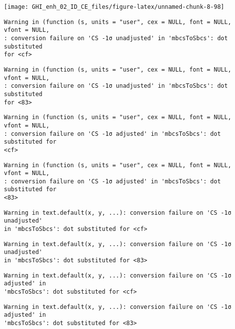 \documentclass[
  10pt,
  a4paper,oneside]{article}
\begin{document}
\begin{center}\texttt{[image: GHI\_enh\_02\_ID\_CE\_files/figure-latex/unnamed-chunk-8-98]} \end{center}

\begin{verbatim}
Warning in (function (s, units = "user", cex = NULL, font = NULL, vfont = NULL,
: conversion failure on 'CS -1σ unadjusted' in 'mbcsToSbcs': dot substituted
for <cf>
\end{verbatim}

\begin{verbatim}
Warning in (function (s, units = "user", cex = NULL, font = NULL, vfont = NULL,
: conversion failure on 'CS -1σ unadjusted' in 'mbcsToSbcs': dot substituted
for <83>
\end{verbatim}

\begin{verbatim}
Warning in (function (s, units = "user", cex = NULL, font = NULL, vfont = NULL,
: conversion failure on 'CS -1σ adjusted' in 'mbcsToSbcs': dot substituted for
<cf>
\end{verbatim}

\begin{verbatim}
Warning in (function (s, units = "user", cex = NULL, font = NULL, vfont = NULL,
: conversion failure on 'CS -1σ adjusted' in 'mbcsToSbcs': dot substituted for
<83>
\end{verbatim}

\begin{verbatim}
Warning in text.default(x, y, ...): conversion failure on 'CS -1σ unadjusted'
in 'mbcsToSbcs': dot substituted for <cf>
\end{verbatim}

\begin{verbatim}
Warning in text.default(x, y, ...): conversion failure on 'CS -1σ unadjusted'
in 'mbcsToSbcs': dot substituted for <83>
\end{verbatim}

\begin{verbatim}
Warning in text.default(x, y, ...): conversion failure on 'CS -1σ adjusted' in
'mbcsToSbcs': dot substituted for <cf>
\end{verbatim}

\begin{verbatim}
Warning in text.default(x, y, ...): conversion failure on 'CS -1σ adjusted' in
'mbcsToSbcs': dot substituted for <83>
\end{verbatim}
\end{document}
